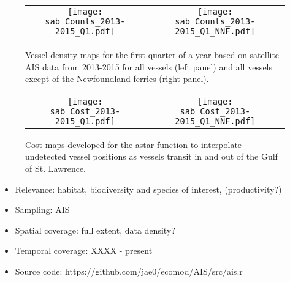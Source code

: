 \documentclass[letterpaper,portrait,11pt]{scrartcl}
\numberwithin{equation}{section}		%
\numberwithin{figure}{section}			%
\numberwithin{table}{section}				%
\newcommand{\ecomod}{\string~/ecomod_data/}   %
\newcommand{\sab}{\ecomod/mpa/sab/}   %
\begin{document}
\begin{itemize*}
\begin{figure}[h]
	\centering
	\begin{tabular}{cc}
		\texttt{[image: \\sab Counts\_2013-2015\_Q1.pdf]} &
		\texttt{[image: \\sab Counts\_2013-2015\_Q1\_NNF.pdf]}
	\end{tabular}
	\caption{Vessel density maps for the first quarter of a year based on satellite AIS data from 2013-2015 for all vessels (left panel) and all vessels except of the Newfoundland ferries (right panel).}
	\label{fig:countmaps}
\end{figure}




\begin{figure}[h]
	\centering
	\begin{tabular}{cc}
		\texttt{[image: \\sab Cost\_2013-2015\_Q1.pdf]} &
		\texttt{[image: \\sab Cost\_2013-2015\_Q1\_NNF.pdf]}
	\end{tabular}
	\caption{Cost maps developed for the astar function to interpolate undetected vessel positions as vessels transit in and out of the Gulf of St. Lawrence.}
	\label{fig:costmap}
\end{figure}




\begin{itemize}
  \item Relevance:  habitat, biodiversity and species of interest, (productivity?)
  \item Sampling:  AIS
  \item Spatial coverage: full extent, data density?
  \item Temporal coverage: XXXX - present
  \item Source code: https://github.com/jae0/ecomod/AIS/src/ais.r
\end{itemize}	



\end{itemize*}
\end{document}
